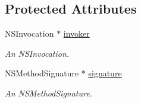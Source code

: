 \subsection*{Protected Attributes}
\begin{DoxyCompactItemize}
\item 
\hypertarget{interface_g_d_callback_a00bc26d522517d27696421319a1ca34e}{
NSInvocation $\ast$ \hyperlink{interface_g_d_callback_a00bc26d522517d27696421319a1ca34e}{invoker}}
\label{interface_g_d_callback_a00bc26d522517d27696421319a1ca34e}

\begin{DoxyCompactList}\small\item\em An NSInvocation. \item\end{DoxyCompactList}\item 
\hypertarget{interface_g_d_callback_a8c87fdaef8c21220d3a1dff085ddf659}{
NSMethodSignature $\ast$ \hyperlink{interface_g_d_callback_a8c87fdaef8c21220d3a1dff085ddf659}{signature}}
\label{interface_g_d_callback_a8c87fdaef8c21220d3a1dff085ddf659}

\begin{DoxyCompactList}\small\item\em An NSMethodSignature. \item\end{DoxyCompactList}\end{DoxyCompactItemize}
